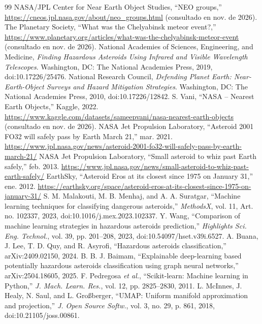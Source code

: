 \documentclass[conference]{IEEEtran}
\begin{document}
\begin{thebibliography}{99}
 NASA/JPL Center for Near Earth Object Studies, ``NEO groups,'' \url{https://cneos.jpl.nasa.gov/about/neo_groups.html} (consultado en nov. de 2026).
 The Planetary Society, ``What was the Chelyabinsk meteor event?,'' \url{https://www.planetary.org/articles/what-was-the-chelyabinsk-meteor-event} (consultado en nov. de 2026).
 National Academies of Sciences, Engineering, and Medicine, \emph{Finding Hazardous Asteroids Using Infrared and Visible Wavelength Telescopes}. Washington, DC: The National Academies Press, 2019, doi:10.17226/25476.
 National Research Council, \emph{Defending Planet Earth: Near-Earth-Object Surveys and Hazard Mitigation Strategies}. Washington, DC: The National Academies Press, 2010, doi:10.17226/12842.
 S. Vani, ``NASA -- Nearest Earth Objects,'' Kaggle, 2022. \url{https://www.kaggle.com/datasets/sameepvani/nasa-nearest-earth-objects} (consultado en nov. de 2026).
 NASA Jet Propulsion Laboratory, ``Asteroid 2001 FO32 will safely pass by Earth March 21,'' mar. 2021. \url{https://www.jpl.nasa.gov/news/asteroid-2001-fo32-will-safely-pass-by-earth-march-21/}
 NASA Jet Propulsion Laboratory, ``Small asteroid to whiz past Earth safely,'' feb. 2013. \url{https://www.jpl.nasa.gov/news/small-asteroid-to-whiz-past-earth-safely/}
 EarthSky, ``Asteroid Eros at its closest since 1975 on January 31,'' ene. 2012. \url{https://earthsky.org/space/asteroid-eros-at-its-closest-since-1975-on-january-31/}
 S. M. Malakouti, M. B. Menhaj, and A. A. Suratgar, ``Machine learning techniques for classifying dangerous asteroids,'' \emph{MethodsX}, vol. 11, Art. no. 102337, 2023, doi:10.1016/j.mex.2023.102337.
 Y. Wang, ``Comparison of machine learning strategies in hazardous asteroids prediction,'' \emph{Highlights Sci. Eng. Technol.}, vol. 39, pp. 201--208, 2023, doi:10.54097/hset.v39i.6527.
 A. Buana, J. Lee, T. D. Quy, and R. Asyrofi, ``Hazardous asteroids classification,'' arXiv:2409.02150, 2024.
 B. B. J. Baimam, ``Explainable deep-learning based potentially hazardous asteroids classification using graph neural networks,'' arXiv:2504.18605, 2025.
 F. Pedregosa \emph{et al.}, ``Scikit-learn: Machine learning in Python,'' \emph{J. Mach. Learn. Res.}, vol. 12, pp. 2825--2830, 2011.
 L. McInnes, J. Healy, N. Saul, and L. Großberger, ``UMAP: Uniform manifold approximation and projection,'' \emph{J. Open Source Softw.}, vol. 3, no. 29, p. 861, 2018, doi:10.21105/joss.00861.
\end{thebibliography}
\end{document}
